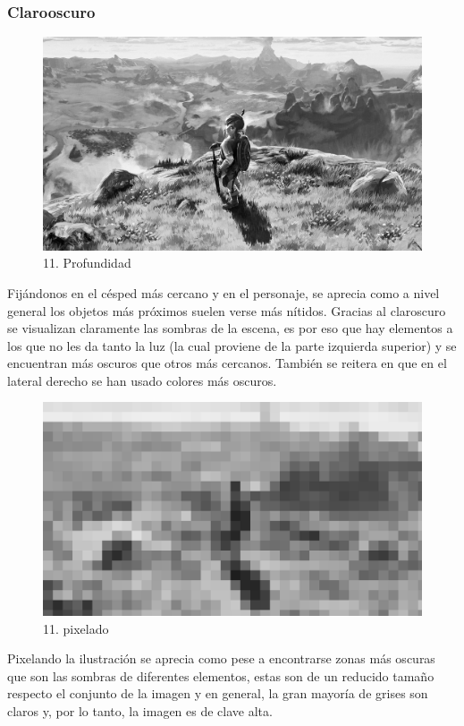 \documentclass[12pt]{article}
\begin{document}
  \subsubsection{Clarooscuro}
      \begin{figure}[H]
    \centering
    \includegraphics[width=\textwidth]{images/Carlos/15/Grises.jpg}
    \caption{\small 11. Profundidad}
  \end{figure}
  Fijándonos en el césped más cercano y en el personaje, se aprecia como a nivel general los objetos más próximos suelen verse más nítidos. Gracias al claroscuro se visualizan claramente las sombras de la escena, es por eso que hay elementos a los que no les da tanto la luz (la cual proviene de la parte izquierda superior) y se encuentran más oscuros que otros más cercanos. También se reitera en que en el lateral derecho se han usado colores más oscuros.

  \begin{figure}[H]
    \centering
    \includegraphics[width=\textwidth]{images/Carlos/15/Pixelart.jpg}
    \caption{\small 11. pixelado}
  \end{figure}
  Pixelando la ilustración se aprecia como pese a encontrarse zonas más oscuras que son las sombras de diferentes elementos, estas son de un reducido tamaño respecto el conjunto de la imagen y en general, la gran mayoría de grises son claros y, por lo tanto, la imagen es de clave alta.
\end{document}
